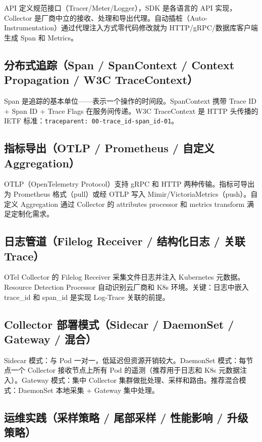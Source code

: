 \documentclass[12pt,UTF8]{ctexbook}
\begin{document}
API 定义规范接口（Tracer/Meter/Logger），SDK 是各语言的 API 实现，Collector 是厂商中立的接收、处理和导出代理。自动插桩（Auto-Instrumentation）通过代理注入方式零代码修改就为 HTTP/gRPC/数据库客户端生成 Span 和 Metrics。

    \subsection{分布式追踪（Span / SpanContext / Context Propagation / W3C TraceContext）}

Span 是追踪的基本单位——表示一个操作的时间段。SpanContext 携带 Trace ID + Span ID + Trace Flags 在服务间传递。W3C TraceContext 是 HTTP 头传播的 IETF 标准：\texttt{traceparent: 00-trace\_id-span\_id-01}。

    \subsection{指标导出（OTLP / Prometheus / 自定义 Aggregation）}

OTLP（OpenTelemetry Protocol）支持 gRPC 和 HTTP 两种传输。指标可导出为 Prometheus 格式（pull）或经 OTLP 写入 Mimir/VictoriaMetrics（push）。自定义 Aggregation 通过 Collector 的 attributes processor 和 metrics transform 满足定制化需求。

    \subsection{日志管道（Filelog Receiver / 结构化日志 / 关联 Trace）}

OTel Collector 的 Filelog Receiver 采集文件日志并注入 Kubernetes 元数据。Resource Detection Processor 自动识别云厂商和 K8s 环境。关键：日志中嵌入 trace\_id 和 span\_id 是实现 Log-Trace 关联的前提。

    \subsection{Collector 部署模式（Sidecar / DaemonSet / Gateway / 混合）}

Sidecar 模式：与 Pod 一对一，低延迟但资源开销较大。DaemonSet 模式：每节点一个 Collector 接收节点上所有 Pod 的遥测（推荐用于日志和 K8s 元数据注入）。Gateway 模式：集中 Collector 集群做批处理、采样和路由。推荐混合模式：DaemonSet 本地采集 + Gateway 集中处理。

    \subsection{运维实践（采样策略 / 尾部采样 / 性能影响 / 升级策略）}
\end{document}
